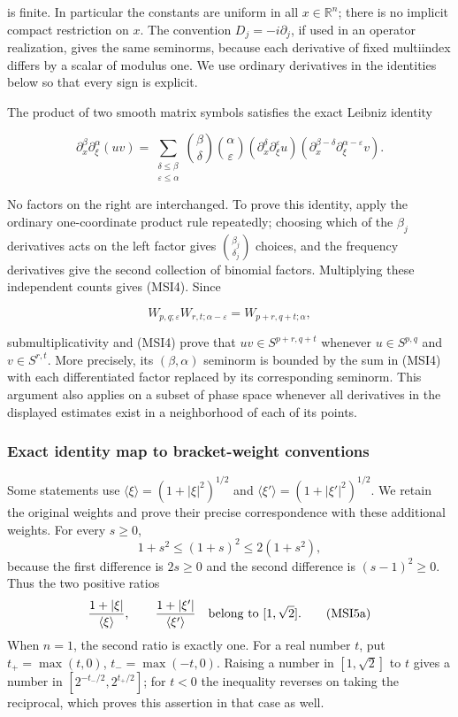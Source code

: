 \documentclass[
  11pt,
]{article}
\begin{document}
is finite. In particular the constants are uniform in all
\(x\in\mathbb R^n\); there is no implicit compact restriction on \(x\).
The convention \(D_j=-i\partial_j\), if used in an operator realization,
gives the same seminorms, because each derivative of fixed multiindex
differs by a scalar of modulus one. We use ordinary derivatives in the
identities below so that every sign is explicit.

The product of two smooth matrix symbols satisfies the exact Leibniz
identity

\[
\partial_x^\beta\partial_\xi^\alpha(uv)
=\sum_{\substack{\delta\leq\beta\\\varepsilon\leq\alpha}}
 \binom\beta\delta\binom\alpha\varepsilon
 (\partial_x^\delta\partial_\xi^\varepsilon u)
 (\partial_x^{\beta-\delta}\partial_\xi^{\alpha-\varepsilon}v).
\tag{MSI4}
\]

No factors on the right are interchanged. To prove this identity, apply
the ordinary one-coordinate product rule repeatedly; choosing which of
the \(\beta_j\) derivatives acts on the left factor gives
\(\binom{\beta_j}{\delta_j}\) choices, and the frequency derivatives
give the second collection of binomial factors. Multiplying these
independent counts gives (MSI4). Since

\[
W_{p,q;\varepsilon}
W_{r,t;\alpha-\varepsilon}
=W_{p+r,q+t;\alpha},
\tag{MSI5}
\]

submultiplicativity and (MSI4) prove that \(uv\in S^{p+r,q+t}\) whenever
\(u\in S^{p,q}\) and \(v\in S^{r,t}\). More precisely, its
\((\beta,\alpha)\) seminorm is bounded by the sum in (MSI4) with each
differentiated factor replaced by its corresponding seminorm. This
argument also applies on a subset of phase space whenever all
derivatives in the displayed estimates exist in a neighborhood of each
of its points.

\subsubsection{Exact identity map to bracket-weight
conventions}\label{exact-identity-map-to-bracket-weight-conventions}

Some statements use \(\langle\xi\rangle=(1+|\xi|^2)^{1/2}\) and
\(\langle\xi'\rangle=(1+|\xi'|^2)^{1/2}\). We retain the original
weights and prove their precise correspondence with these additional
weights. For every \(s\geq0\), \[
 1+s^2\leq(1+s)^2\leq2(1+s^2),
\] because the first difference is \(2s\geq0\) and the second difference
is \((s-1)^2\geq0\). Thus the two positive ratios \[
 \frac{1+|\xi|}{\langle\xi\rangle},\qquad
 \frac{1+|\xi'|}{\langle\xi'\rangle}
 \quad\hbox{belong to }[1,\sqrt2].
 \tag{MSI5a}
\] When \(n=1\), the second ratio is exactly one. For a real number
\(t\), put \(t_+=\max(t,0)\), \(t_-=\max(-t,0)\). Raising a number in
\([1,\sqrt2]\) to \(t\) gives a number in \([2^{-t_-/2},2^{t_+/2}]\);
for \(t<0\) the inequality reverses on taking the reciprocal, which
proves this assertion in that case as well.
\end{document}
